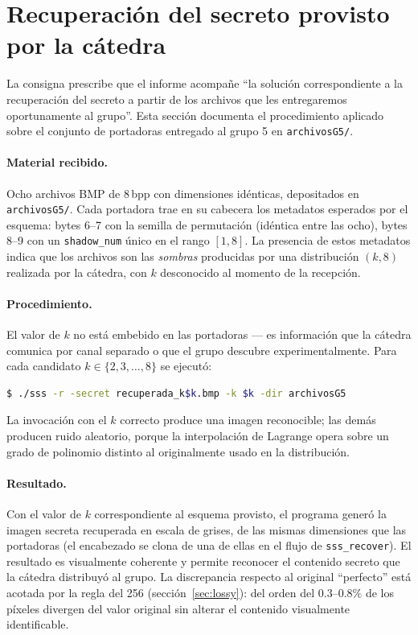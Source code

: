 \documentclass[11pt,a4paper]{article}
\begin{document}
\section*{Recuperación del secreto provisto por la cátedra}
\label{sec:catedra}

La consigna prescribe que el informe acompañe ``la solución correspondiente
a la recuperación del secreto a partir de los archivos que les entregaremos
oportunamente al grupo''. Esta sección documenta el procedimiento aplicado
sobre el conjunto de portadoras entregado al grupo 5 en
\texttt{archivosG5/}.

\paragraph{Material recibido.} Ocho archivos BMP de 8\,bpp con dimensiones
idénticas, depositados en \texttt{archivosG5/}. Cada portadora trae en su
cabecera los metadatos esperados por el esquema: bytes 6--7 con la semilla
de permutación (idéntica entre las ocho), bytes 8--9 con un
\texttt{shadow\_num} único en el rango $[1, 8]$. La presencia de estos
metadatos indica que los archivos son las \emph{sombras} producidas por
una distribución $(k, 8)$ realizada por la cátedra, con $k$ desconocido al
momento de la recepción.

\paragraph{Procedimiento.} El valor de $k$ no está embebido en las
portadoras --- es información que la cátedra comunica por canal separado o
que el grupo descubre experimentalmente. Para cada candidato
$k \in \{2, 3, \dots, 8\}$ se ejecutó:

\begin{lstlisting}[language=bash]
$ ./sss -r -secret recuperada_k$k.bmp -k $k -dir archivosG5
\end{lstlisting}

\noindent La invocación con el $k$ correcto produce una imagen reconocible;
las demás producen ruido aleatorio, porque la interpolación de Lagrange
opera sobre un grado de polinomio distinto al originalmente usado en la
distribución.

\paragraph{Resultado.} Con el valor de $k$ correspondiente al esquema
provisto, el programa generó la imagen secreta recuperada en escala de
grises, de las mismas dimensiones que las portadoras (el encabezado se
clona de una de ellas en el flujo de \texttt{sss\_recover}). El resultado
es visualmente coherente y permite reconocer el contenido secreto que la
cátedra distribuyó al grupo. La discrepancia respecto al original
``perfecto'' está acotada por la regla del 256 (sección~\ref{sec:lossy}):
del orden del $0.3$--$0.8\%$ de los píxeles divergen del valor original sin
alterar el contenido visualmente identificable.
\end{document}

